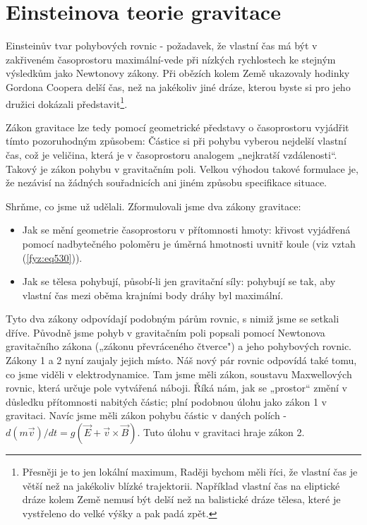 {  \section{Einsteinova teorie gravitace}\label{fyz:IIchapXVLIIsecIX}
    Einsteinův tvar pohybových rovnic - požadavek, že vlastní čas má být v zakřiveném časoprostoru 
    maximální-vede při nízkých rychlostech ke stejným výsledkům jako Newtonovy zákony. Při obězích 
    kolem Země ukazovaly hodinky Gordona Coopera delší čas, než na jakékoliv jiné dráze, kterou 
    byste si pro jeho družici dokázali představit\footnote{Přesněji je to jen lokální maximum, 
    Raději bychom měli říci, že vlastní čas je větší než na jakékoliv blízké trajektorii. Například 
    vlastní čas na eliptické dráze kolem Země nemusí být delší než na balistické dráze tělesa, 
    které je vystřeleno do velké výšky a pak padá zpět.}.
    
    Zákon gravitace lze tedy pomocí geometrické představy o časoprostoru vyjádřit tímto 
    pozoruhodným způsobem: Částice si při pohybu vyberou nejdelší vlastní čas, což je veličina, 
    která je v časoprostoru analogem „nejkratší vzdálenosti“. Takový je zákon pohybu v gravitačním 
    poli. Velkou výhodou takové formulace je, že nezávisí na žádných souřadnicích ani jiném způsobu 
    specifikace situace.
    
    Shrňme, co jsme už udělali. Zformulovali jsme dva zákony gravitace:
    \begin{itemize}
      \item Jak se mění geometrie časoprostoru v přítomnosti hmoty: křivost vyjádřená pomocí 
            nadbytečného poloměru je úměrná hmotnosti uvnitř koule (viz vztah (\ref{fyz:eq530})).
      \item Jak se tělesa pohybují, působí-li jen gravitační síly: pohybují se tak, aby vlastní čas 
             mezi oběma krajními body dráhy byl maximální.
    \end{itemize}
    
    Tyto dva zákony odpovídají podobným párům rovnic, s nimiž jsme se setkali dříve. Původně jsme 
    pohyb v gravitačním poli popsali pomocí Newtonova gravitačního zákona („zákonu převráceného 
    čtverce") a jeho pohybových rovnic. Zákony \num{1} a \num{2} nyní zaujaly jejich místo. Náš 
    nový pár rovnic odpovídá také tomu, co jsme viděli v elektrodynamice. Tam jsme měli zákon, 
    soustavu Maxwellových rovnic, která určuje pole vytvářená náboji. Říká nám, jak se „prostor“ 
    změní v důsledku přítomnosti nabitých částic; plní podobnou úlohu jako zákon 1 v gravitaci. 
    Navíc jsme měli zákon pohybu částic v daných polích - \(d(m\vec{v})/dt = g(\vec{E} + 
    \vec{v}\times\vec{B})\). Tuto úlohu v gravitaci hraje zákon \num{2}.
    
}
